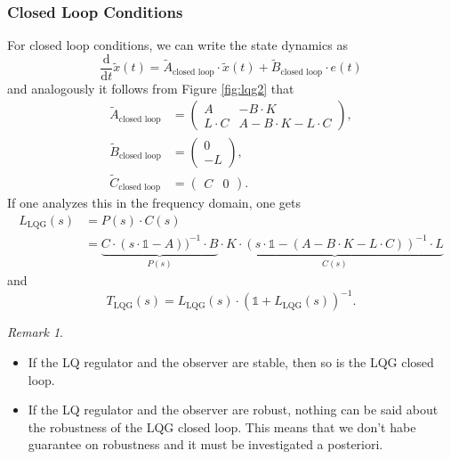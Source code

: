 \documentclass[a4paper,12 pt]{article}
\numberwithin{equation}{section}
\theoremstyle{definition}
\theoremstyle{remark}
\newtheorem*{bmk}{Remark}
\theoremstyle{definition}
\theoremstyle{definition}
\theoremstyle{definition}
\theoremstyle{remark}
\begin{document}
\subsubsection*{Closed Loop Conditions}
For closed loop conditions, we can write the state dynamics as
\begin{equation}
\frac{\text{d}}{\text{d}t}\tilde{x}(t)=\tilde{A}_{\text{closed loop}}\cdot \tilde{x}(t)+\tilde{B}_{\text{closed loop}}\cdot e(t)
\end{equation}
and analogously it follows from Figure \ref{fig:lqg2} that
\begin{equation}
\begin{split}
\tilde{A}_{\text{closed loop}}&=\begin{pmatrix}
A&-B\cdot K\\
L\cdot C&A-B\cdot K -L\cdot C
\end{pmatrix},\\
\tilde{B}_{\text{closed loop}}&=\begin{pmatrix}
0\\
-L
\end{pmatrix},\\
\tilde{C}_{\text{closed loop}}&=\begin{pmatrix}
C&0
\end{pmatrix}.
\end{split}
\end{equation}
If one analyzes this in the frequency domain, one gets
\begin{equation}
\begin{split}
L_{\text{LQG}}(s)&=P(s)\cdot C(s)\\
&=\underbrace{C\cdot \left( s\cdot \mathbb{1}-A\right))^{-1}\cdot B}_{P(s)}\cdot \underbrace{K\cdot \left( s\cdot \mathbb{1} -(A-B\cdot K-L\cdot C)\right)^{-1}\cdot L}_{C(s)}
\end{split}
\end{equation}
and
\begin{equation}
T_{\text{LQG}}(s)=L_{\text{LQG}}(s)\cdot (\mathbb{1}+L_{\text{LQG}}(s))^{-1}.
\end{equation}
\begin{bmk}
\
\begin{itemize}
\item If the LQ regulator and the observer are stable, then so is the LQG closed loop.
\item If the LQ regulator and the observer are robust, nothing can be said about the robustness of the LQG closed loop. This means that we don't habe guarantee on robustness and it must be investigated a posteriori.
\end{itemize}

\end{bmk}
\end{document}

